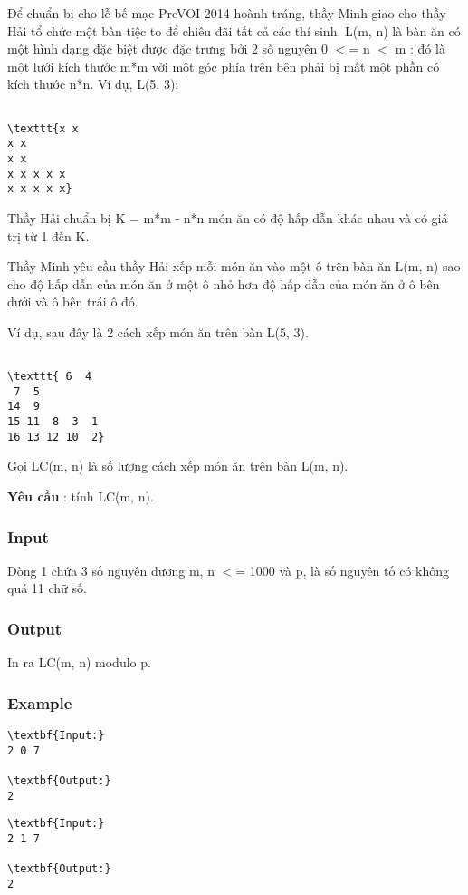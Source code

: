 

Để chuẩn bị cho lễ bế mạc PreVOI 2014 hoành tráng, thầy Minh giao cho thầy Hải tổ chức một bàn tiệc to để chiêu đãi tất cả các thí sinh. L(m, n) là bàn ăn có một hình dạng đặc biệt được đặc trưng bởi 2 số nguyên 0 $<$= n $<$ m : đó là một lưới kích thước m*m với một góc phía trên bên phải bị mất một phần có kích thước n*n. Ví dụ, L(5, 3):
\begin{verbatim}

\texttt{x x
x x
x x
x x x x x
x x x x x}\end{verbatim}

Thầy Hải chuẩn bị K = m*m - n*n món ăn có độ hấp dẫn khác nhau và có giá trị từ 1 đến K.

Thầy Minh yêu cầu thầy Hải xếp mỗi món ăn vào một ô trên bàn ăn L(m, n) sao cho độ hấp dẫn của món ăn ở một ô nhỏ hơn độ hấp dẫn của món ăn ở ô bên dưới và ô bên trái ô đó.

Ví dụ, sau đây là 2 cách xếp món ăn trên bàn L(5, 3).
\begin{verbatim}

\texttt{ 6  4
 7  5
14  9
15 11  8  3  1
16 13 12 10  2}\end{verbatim}

Gọi LC(m, n) là số lượng cách xếp món ăn trên bàn L(m, n).

\textbf{Yêu cầu } : tính LC(m, n).

\subsubsection{Input}

Dòng 1 chứa 3 số nguyên dương m, n $<$= 1000 và p, là số nguyên tố có không quá 11 chữ số.

\subsubsection{Output}

In ra LC(m, n) modulo p.

\subsubsection{Example}
\begin{verbatim}
\textbf{Input:}
2 0 7

\textbf{Output:}
2\end{verbatim}
\begin{verbatim}
\textbf{Input:}
2 1 7

\textbf{Output:}
2\end{verbatim}